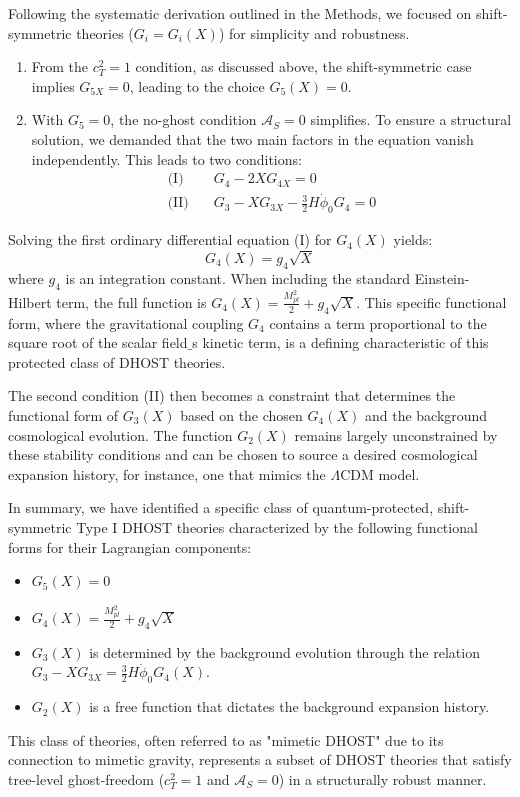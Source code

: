 \documentclass[twocolumn]{aastex631}
\begin{document}
Following the systematic derivation outlined in the Methods, we focused on shift-symmetric theories ($G_i = G_i(X)$) for simplicity and robustness.
\begin{enumerate}
    \item From the $c_T^2=1$ condition, as discussed above, the shift-symmetric case implies $G_{5X}=0$, leading to the choice $G_5(X)=0$.
    \item With $G_5=0$, the no-ghost condition $\mathcal{A}_S=0$ simplifies. To ensure a structural solution, we demanded that the two main factors in the equation vanish independently. This leads to two conditions:
    \begin{align}
    \text{(I)} & \quad G_4 - 2XG_{4X} = 0 \\
    \text{(II)} & \quad G_3 - XG_{3X} - \frac{3}{2}H\dot{\phi}_0 G_4 = 0
    \end{align}
\end{enumerate}
Solving the first ordinary differential equation (I) for $G_4(X)$ yields:
\begin{equation}
G_4(X) = g_4 \sqrt{X}
\end{equation}
where $g_4$ is an integration constant. When including the standard Einstein-Hilbert term, the full function is $G_4(X) = \frac{M_{pl}^2}{2} + g_4\sqrt{X}$. This specific functional form, where the gravitational coupling $G_4$ contains a term proportional to the square root of the scalar field\ensuremath{\_}s kinetic term, is a defining characteristic of this protected class of DHOST theories.

The second condition (II) then becomes a constraint that determines the functional form of $G_3(X)$ based on the chosen $G_4(X)$ and the background cosmological evolution. The function $G_2(X)$ remains largely unconstrained by these stability conditions and can be chosen to source a desired cosmological expansion history, for instance, one that mimics the $\Lambda$CDM model.

In summary, we have identified a specific class of quantum-protected, shift-symmetric Type I DHOST theories characterized by the following functional forms for their Lagrangian components:
\begin{itemize}
    \item $G_5(X) = 0$
    \item $G_4(X) = \frac{M_{pl}^2}{2} + g_4 \sqrt{X}$
    \item $G_3(X)$ is determined by the background evolution through the relation $G_3 - XG_{3X} = \frac{3}{2}H\dot{\phi}_0 G_4(X)$.
    \item $G_2(X)$ is a free function that dictates the background expansion history.
\end{itemize}
This class of theories, often referred to as "mimetic DHOST" due to its connection to mimetic gravity, represents a subset of DHOST theories that satisfy tree-level ghost-freedom ($c_T^2=1$ and $\mathcal{A}_S=0$) in a structurally robust manner.
\end{document}
